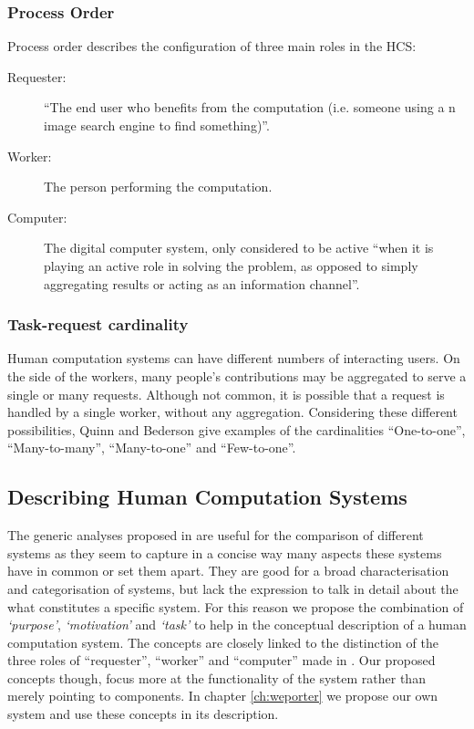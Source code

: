 \subsubsection{Process Order}
Process order describes the configuration of three main roles in the HCS\cite{Quinn:2011us}:

\begin{description}
  \item[Requester:] ``The end user who benefits from the computation (i.e. someone using a n image search engine to find something)''.
  \item[Worker:] The person performing the computation.
  \item[Computer:] The digital computer system, only considered to be active ``when it is playing an active role in solving the problem, as opposed to simply aggregating results or acting as an information channel''.
\end{description}


\subsubsection{Task-request cardinality}
Human computation systems can have different numbers of interacting users. On the side of the workers, many people's contributions may be aggregated to serve a single or many requests. Although not common, it is possible that a request is handled by a single worker, without any aggregation. Considering these different possibilities, Quinn and Bederson give examples of the cardinalities 
``One-to-one'', ``Many-to-many'', ``Many-to-one'' and ``Few-to-one''.


\subsection{Describing Human Computation Systems} %
\label{sub:describing_human_computation_systems}

The generic analyses proposed in \cite{Quinn:2011us} are useful for the comparison of different systems as they seem to capture in a concise way many aspects these systems have in common or set them apart. They are good for a broad characterisation and categorisation of systems, but lack the expression to talk in detail about the what constitutes a specific system. For this reason we propose the  combination of \emph{`purpose'}, \emph{`motivation'} and \emph{`task'} to help in the conceptual description of a human computation system. The concepts are closely linked to the distinction of the three roles of ``requester'', ``worker'' and ``computer'' made in \cite{Quinn:2011us}. Our proposed concepts though, focus more at the functionality of the system rather than merely pointing to components. In chapter \ref{ch:weporter} we propose our own system and use these concepts in its description.

